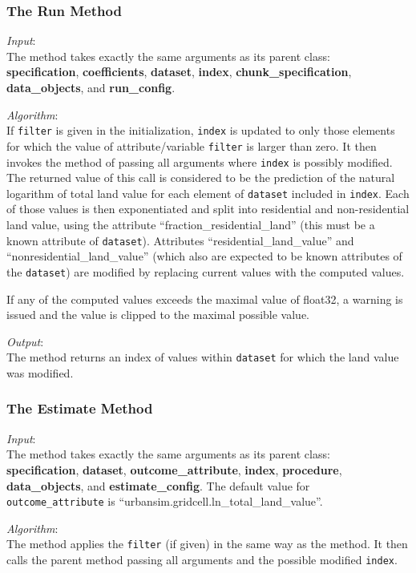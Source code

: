 \subsubsection{The Run Method}
%
{\it Input}:\\[1mm]
The  method takes exactly the same arguments as its parent
class:\\
{\bf specification}, {\bf coefficients}, {\bf dataset}, {\bf index}, {\bf
  chunk_specification}, {\bf data_objects}, and {\bf run_config}.

{\it Algorithm}:\\[1mm]
If \verb|filter| is given in the initialization, \verb|index| is
updated to only those elements for which the value of
attribute/variable \verb|filter| is
larger than zero. It then invokes the  method of
 passing all arguments where
\verb|index| is possibly modified. The returned value of this call
is considered to be the prediction of the natural logarithm of total
land value for each element of \verb|dataset| included in
\verb|index|. Each of those values is then exponentiated and split
into residential and non-residential land value, using the attribute
``fraction_residential_land'' (this must be a known
attribute of \verb|dataset|).
Attributes ``residential_land_value'' and
``nonresidential_land_value'' (which also are expected to be known
attributes  of the \verb|dataset|) are modified by
replacing current values with the computed values.

If any of the computed values exceeds the maximal value of float32, a warning
is issued and the value is clipped to the maximal possible value.

{\it Output}:\\[1mm]
The method returns an index of values within \verb|dataset| for which the land
value was modified.

\subsubsection{The Estimate Method}
{\it Input}:\\[1mm]
The  method takes exactly the same arguments as its parent
class: \\
{\bf specification}, {\bf dataset}, {\bf outcome_attribute}, {\bf index}, {\bf
  procedure}, {\bf data_objects}, and {\bf estimate_config}. The default value 
for \verb|outcome_attribute| is ``urbansim.gridcell.ln_total_land_value''.

{\it Algorithm}:\\[1mm]
The method applies the \verb|filter| (if given) in the same way as the
 method. It then calls the parent method 
passing all arguments and the possible modified \verb|index|.

